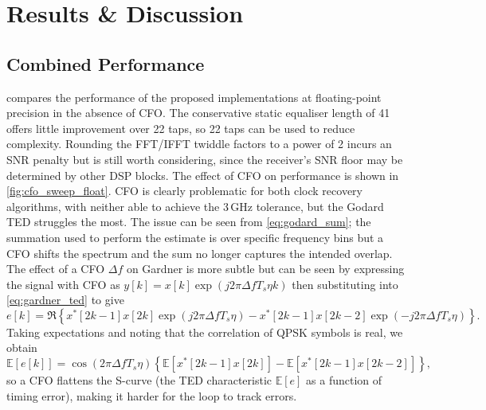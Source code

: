\documentclass[12pt,a4paper]{report}
\begin{document}
\section{Results \& Discussion}
\subsection{Combined Performance}
 compares the performance of the proposed implementations at floating-point precision in the absence of CFO. The conservative static equaliser length of 41 offers little improvement over 22 taps, so 22 taps can be used to reduce complexity. Rounding the FFT/IFFT twiddle factors to a power of 2 incurs an SNR penalty but is still worth considering, since the receiver's SNR floor may be determined by other DSP blocks. The effect of CFO on performance is shown in \cref{fig:cfo_sweep_float}. CFO is clearly problematic for both clock recovery algorithms, with neither able to achieve the 3\,GHz tolerance, but the Godard TED struggles the most. The issue can be seen from \cref{eq:godard_sum}; the summation used to perform the estimate is over specific frequency bins but a CFO shifts the spectrum and the sum no longer captures the intended overlap. The effect of a CFO $\Delta f$ on Gardner is more subtle but can be seen by expressing the signal with CFO as $y[k] = x[k]\exp{(j2\pi \Delta f T_s\eta k)}$ then substituting into \cref{eq:gardner_ted} to give
\begin{equation}
    e[k] = \Re\left\{x^*[2k-1]x[2k]\exp{(j2\pi\Delta f T_s\eta)} - x^*[2k-1]x[2k-2]\exp{(-j2\pi\Delta f T_s\eta)}\right\}.
\end{equation}
Taking expectations and noting that the correlation of QPSK symbols is real, we obtain
\begin{equation}
    \mathbb{E}\left[e[k]\right] = \cos(2\pi\Delta f T_s\eta)\left\{\mathbb{E}\left[x^*[2k-1]x[2k]\right] - \mathbb{E}\left[x^*[2k-1]x[2k-2]\right]\right\},
\end{equation}
so a CFO flattens the S-curve (the TED characteristic $\mathbb{E}\left[e\right]$ as a function of timing error), making it harder for the loop to track errors.
\end{document}
